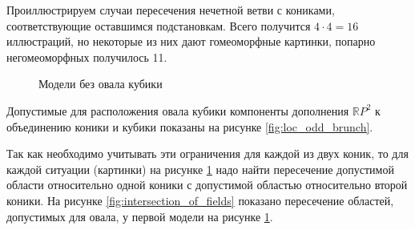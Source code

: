 \documentclass[14pt]{article}
\begin{document}
Проиллюстрируем случаи пересечения нечетной ветви с кониками, соответствующие оставшимся подстановкам. Всего получится $4 \cdot 4 = 16$ иллюстраций, но некоторые из них дают гомеоморфные картинки, попарно негомеоморфных получилось 11. 

\begin{figure}[H]
\caption{Модели без овала кубики}
\label{fig:curves_without_ovals}
\end{figure}

Допустимые для расположения овала кубики компоненты дополнения $\mathbb RP^2$ к объединению коники и кубики показаны на рисунке \ref{fig:loc_odd_brunch}.

Так как необходимо учитывать эти ограничения для каждой из двух коник, то для каждой ситуации (картинки) на рисунке \ref{fig:curves_without_ovals} надо найти пересечение допустимой области относительно одной коники с допустимой областью относительно второй коники. На рисунке \ref{fig:intersection_of_fields} показано пересечение областей, допустимых для овала, у первой модели на рисунке \ref{fig:curves_without_ovals}.
\end{document}
